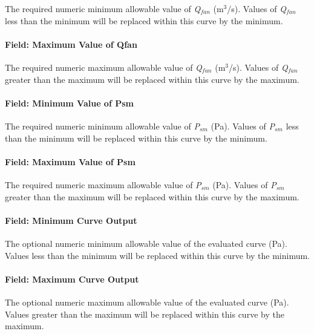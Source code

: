 The required numeric minimum allowable value of \emph{Q\(_{fan}\)} (m\(^{3}\)/s). Values of \emph{Q\(_{fan}\)} less than the minimum will be replaced within this curve by the minimum.

\paragraph{Field: Maximum Value of Qfan}\label{field-maximum-value-of-qfan}

The required numeric maximum allowable value of \emph{Q\(_{fan}\)} (m\(^{3}\)/s). Values of \emph{Q\(_{fan}\)} greater than the maximum will be replaced within this curve by the maximum.

\paragraph{Field: Minimum Value of Psm}\label{field-minimum-value-of-psm}

The required numeric minimum allowable value of \emph{P\(_{sm}\)} (Pa). Values of \emph{P\(_{sm}\)} less than the minimum will be replaced within this curve by the minimum.

\paragraph{Field: Maximum Value of Psm}\label{field-maximum-value-of-psm}

The required numeric maximum allowable value of \emph{P\(_{sm}\)} (Pa). Values of \emph{P\(_{sm}\)} greater than the maximum will be replaced within this curve by the maximum.

\paragraph{Field: Minimum Curve Output}\label{field-minimum-curve-output-11}

The optional numeric minimum allowable value of the evaluated curve (Pa). Values less than the minimum will be replaced within this curve by the minimum.

\paragraph{Field: Maximum Curve Output}\label{field-maximum-curve-output-10}

The optional numeric maximum allowable value of the evaluated curve (Pa). Values greater than the maximum will be replaced within this curve by the maximum.

